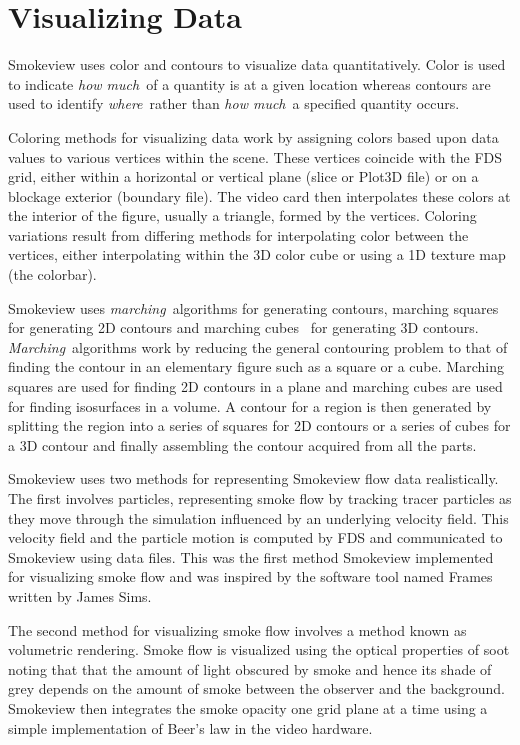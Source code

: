 \documentclass[11pt,twoside]{book}
\begin{document}
%
%

\chapter{Visualizing Data}
Smokeview uses color and contours to visualize data
quantitatively. Color is used to indicate {\em how much}\ of a
quantity is at a given location whereas contours are used to
identify {\em where}\ rather than {\em how much}\ a specified
quantity occurs.

Coloring methods for visualizing data work by assigning colors
based upon data values to various vertices within the scene. These
vertices coincide with the FDS grid, either within a horizontal or
vertical plane (slice or Plot3D file) or on a blockage exterior
(boundary file).  The video card then interpolates these colors at
the interior of the figure, usually a triangle, formed by the
vertices. Coloring variations result from differing methods for
interpolating color between the vertices, either interpolating
within the 3D color cube or using a 1D texture map (the colorbar).

Smokeview uses {\em marching}\ algorithms for generating contours,
marching squares for generating 2D contours and marching
cubes~\cite{marchingcubes} for generating 3D contours. {\em
Marching}\ algorithms work by reducing the general contouring
problem to that of finding the contour in an elementary figure
such as a square or a cube.  Marching squares are used for finding
2D contours in a plane and marching cubes are used for finding
isosurfaces in a volume. A contour for a region is then generated
by splitting the region into a series of squares for 2D contours
or a series of cubes for a 3D contour and finally assembling the
contour acquired from all the parts.

Smokeview uses two methods for representing Smokeview flow data
realistically.  The first involves particles, representing smoke
flow by tracking tracer particles as they move through the
simulation influenced by an underlying  velocity field.  This
velocity field and the particle motion is computed by FDS and
communicated to Smokeview using data files.  This was the first
method Smokeview implemented for visualizing smoke flow and was
inspired by the software tool named Frames written by James Sims.

The second method for visualizing smoke flow involves a method
known as volumetric rendering.  Smoke flow is visualized using the
optical properties of soot noting that that the amount of light
obscured by smoke and hence its shade of grey depends on the
amount of smoke between the observer and the background. Smokeview
then integrates the smoke opacity one grid plane at a time using a
simple implementation of Beer's law in the video hardware.
\end{document}
